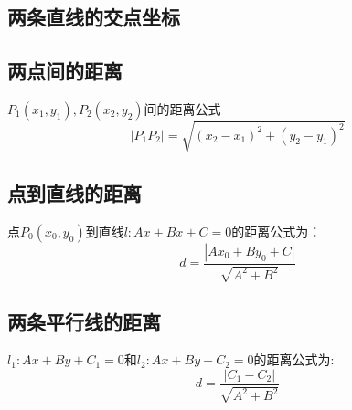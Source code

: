 \subsection{两条直线的交点坐标}
\subsection{两点间的距离}
$P_1(x_1,y_1),P_2(x_2,y_2)$间的距离公式\\
$$|P_1P_2|=\sqrt{(x_2-x_1)^2+(y_2-y_1)^2}$$
\subsection{点到直线的距离}
点$P_0(x_0,y_0)$到直线$l:Ax+Bx+C=0$的距离公式为：\\
$$d=\dfrac{|Ax_0+By_0+C|}{\sqrt{A^2+B^2}}$$
\subsection{两条平行线的距离}
$l_1:Ax+By+C_1=0$和$l_2:Ax+By+C_2=0$的距离公式为:\\
$$d=\dfrac{|C_1-C_2|}{\sqrt{A^2+B^2}}$$


